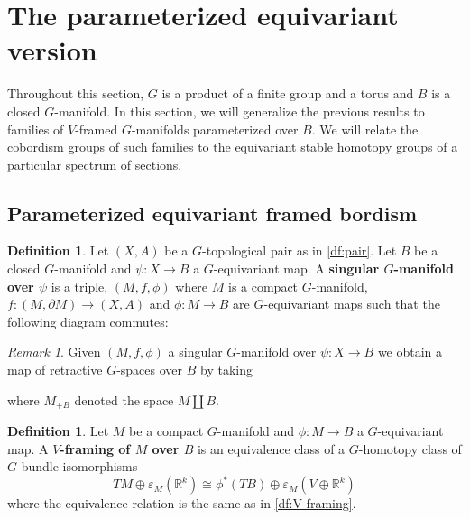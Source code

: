 \documentclass[11pt]{amsart}
\newcommand{\aftersubsection}{}
\newcommand{\R}{\mathbb R}
\theoremstyle{plain}   %
\theoremstyle{definition}
\newtheorem{df}[thm]{Definition}
\theoremstyle{remark}
\newtheorem{rmk}[thm]{Remark}
\numberwithin{equation}{section}
\begin{document}
\section{The parameterized equivariant version}

Throughout this section, $G$ is a product of a finite group and a torus and $B$ is a closed $G$-manifold. In this section, we will generalize the previous results to families of $V$-framed $G$-manifolds parameterized over $B$. We will relate the cobordism groups of such families to the equivariant stable homotopy groups of a particular spectrum of sections. 

\subsection{Parameterized equivariant framed bordism}\aftersubsection

\begin{df}
Let $(X,A)$ be a $G$-topological pair as in \cref{df:pair}. Let $B$ be a closed $G$-manifold and $\psi:X\to B$ a $G$-equivariant map.  A \textbf{singular $G$-manifold over $\psi$} is a triple, $(M,f,\phi)$ where $M$ is a compact $G$-manifold, $f:(M,\partial M)\to (X,A)$ and $\phi:M\to B$ are $G$-equivariant maps such that the following diagram commutes:

\begin{figure}[H]
\center
{}
\end{figure}
\end{df}

\begin{rmk}
Given $(M,f,\phi)$ a singular $G$-manifold over $\psi:X\to B$ we obtain a map of retractive $G$-spaces over $B$ by taking
\begin{figure}[H]
\center
{}
\end{figure}
where $M_{+B}$ denoted the space $M\amalg B$. 
\end{rmk}

\begin{df}
Let $M$ be a compact $G$-manifold and $\phi:M\to B$ a $G$-equivariant map. A \textbf{$V$-framing of $M$ over $B$} is an equivalence class of a $G$-homotopy class of $G$-bundle isomorphisms
\[
TM\oplus \varepsilon_M(\R^{k})\cong \phi^*(TB)\oplus \varepsilon_M(V\oplus\R^k)
\]
where the equivalence relation is the same as in \cref{df:V-framing}.
\end{df}
\end{document}
